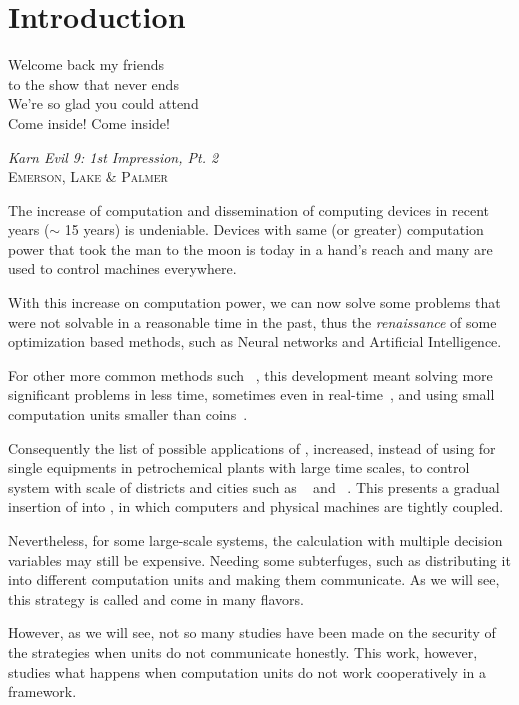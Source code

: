\documentclass[../main.tex]{subfiles}
\begin{document}
\chapter{Introduction}\label{sec:introduction}
\epigraph{\centering Welcome back my friends\\ to the show that never ends\\
We’re so glad you could attend\\ Come inside! Come inside!}
{\textit{Karn Evil 9: 1st Impression, Pt. 2}\\\textsc{Emerson, Lake \& Palmer}}

The increase of computation and dissemination of computing devices in recent years ($\sim$ 15 years) is undeniable.
Devices with same (or greater) computation power that took the man to the moon is today in a hand's reach and many are used to control machines everywhere.

With this increase on computation power, we can now solve some problems that were not solvable in a reasonable time in the past, thus the \emph{renaissance} of some optimization based methods, such as Neural networks and Artificial Intelligence.

For other more common methods such \mpc~\cite{GarciaEtAl1989}, this development meant solving more significant problems in less time, sometimes even in real-time~\cite{BesselmannEtAl2008}, and using small computation units smaller than coins~\cite{BanguraMahony2014}.

Consequently the list of possible applications of \mpc{}, increased, instead of using for single equipments in petrochemical plants with large time scales, to control system with scale of districts and cities such as \wdns~\cite{ZhangEtAl2021} and \dhns~\cite{TaylorEtAl2021}.
This presents a gradual insertion of \mpc{} into \cps{}, in which computers and physical machines are tightly coupled.

Nevertheless, for some large-scale systems, the calculation with multiple decision variables may still be expensive.
Needing some subterfuges, such as distributing it into different computation units and making them communicate.
As we will see, this strategy is called \dmpc and come in many flavors.

However, as we will see, not so many studies have been made on the security of the \dmpc{} strategies when units do not communicate honestly.
This work, however, studies what happens when computation units do not work cooperatively in a \dmpc{} framework.
\end{document}
